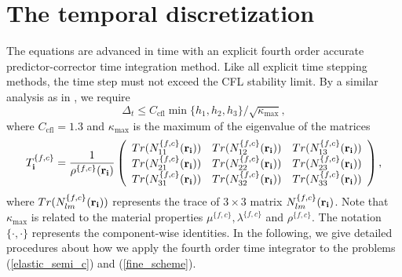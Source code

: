 \section{The temporal discretization}
The equations are advanced in time with an explicit fourth order accurate predictor-corrector time integration method. Like all explicit time stepping methods, the time step must not exceed the CFL stability limit. By a similar analysis as in \cite{sjogreen2012fourth}, we require 
\begin{equation*}
\Delta_t\leq C_{\text{cfl}}\min\{h_1,h_2,h_3\}/\sqrt{\kappa_{\max}},
\end{equation*}
where $C_{\text{cfl}} = 1.3$ and
$\kappa_{\text{max}}$ is the maximum of the eigenvalue of the matrices 
\[T_{\bf i}^{\{f,c\}} = \frac{1}{\rho^{\{f,c\}}({\bf r}_{\bf i})}\left(\begin{array}{ccc}
Tr(N_{11}^{\{f,c\}}({\bf r}_{\bf i})) &  Tr(N_{12}^{\{f,c\}}({\bf r}_{\bf i}))& Tr(N_{13}^{\{f,c\}}({\bf r}_{\bf i}))\\
Tr(N_{21}^{\{f,c\}}({\bf r}_{\bf i})) & Tr(N_{22}^{\{f,c\}}({\bf r}_{\bf i})) & Tr(N_{23}^{\{f,c\}}({\bf r}_{\bf i}))\\
Tr(N_{31}^{\{f,c\}}({\bf r}_{\bf i})) & Tr(N_{32}^{\{f,c\}}({\bf r}_{\bf i})) & Tr(N_{33}^{\{f,c\}}({\bf r}_{\bf i}))\end{array}\right), \]
where $Tr(N_{lm}^{\{f,c\}}({\bf r}_{\bf i}))$ represents the trace of $3\times3$ matrix $N_{lm}^{\{f,c\}}({\bf r}_{\bf i})$. Note that $\kappa_{\text{max}}$ is related to the material properties $\mu^{\{f,c\}}, \lambda^{\{f,c\}}$ and $\rho^{\{f,c\}}$. The notation $\{\cdot,\cdot\}$ represents the component-wise identities. In the following, we give detailed procedures about how we apply the fourth order time integrator to the problems (\ref{elastic_semi_c}) and  (\ref{fine_scheme}). 

